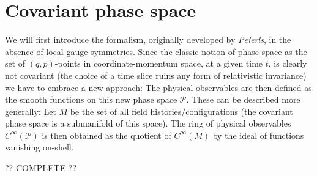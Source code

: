\section{Covariant phase space}

    We will first introduce the formalism, originally developed by \textit{Peierls}, in the absence of local gauge symmetries. Since the classic notion of phase space as the set of $(q,p)$-points in coordinate-momentum space, at a given time $t$, is clearly not covariant (the choice of a time slice ruins any form of relativistic invariance) we have to embrace a new approach:
    The physical observables are then defined as the smooth functions on this new phase space $\mathcal{P}$. These can be described more generally: Let $M$ be the set of all field histories/configurations (the covariant phase space is a submanifold of this space). The ring of physical observables $C^\infty(\mathcal{P})$ is then obtained as the quotient of $C^\infty(M)$ by the ideal of functions vanishing on-shell.

    ?? COMPLETE ??
